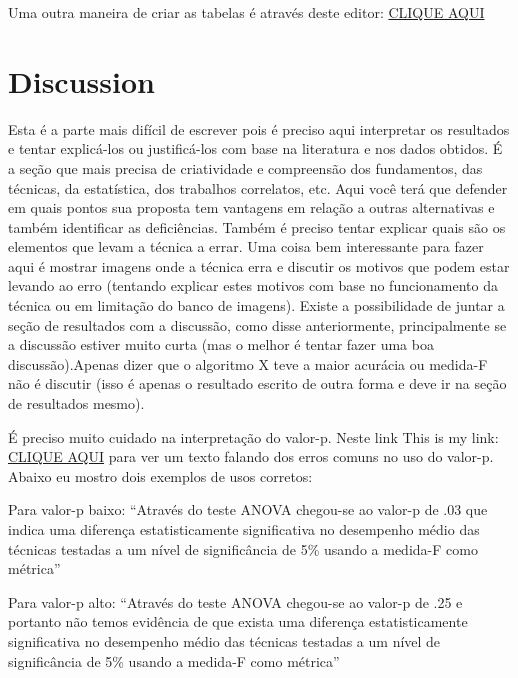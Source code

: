 \documentclass[preprint,10pt,5p]{elsarticle}
\begin{document}
Uma outra maneira de criar as tabelas é através deste editor: \href{https://www.tablesgenerator.com/}{CLIQUE AQUI}








\section{Discussion}




Esta é a parte mais difícil de escrever pois é preciso aqui interpretar os resultados e tentar explicá-los ou justificá-los com base na literatura e nos dados obtidos. É a seção que mais precisa de criatividade e compreensão dos fundamentos, das técnicas, da estatística, dos trabalhos correlatos, etc. Aqui você terá que defender em quais pontos sua proposta tem vantagens em relação a outras alternativas e também identificar as deficiências. Também é preciso tentar explicar quais são os elementos que levam a técnica a errar. Uma coisa bem interessante para fazer aqui é mostrar imagens onde a técnica erra e discutir os motivos que podem estar levando ao erro (tentando explicar estes motivos com base no funcionamento da técnica ou em limitação do banco de imagens). Existe a possibilidade de juntar a seção de resultados com a discussão, como disse anteriormente,  principalmente se a discussão estiver muito curta (mas o melhor é tentar fazer uma boa discussão).Apenas dizer que o algoritmo X teve a maior acurácia ou medida-F não é discutir (isso é apenas o resultado escrito de outra forma e deve ir na seção de resultados mesmo).


É preciso muito cuidado na interpretação do valor-p. Neste link This is my link: \href{https://www.scielo.br/pdf/jbpneu/v41n5/pt_1806-3713-jbpneu-41-05-00485.pdf}{CLIQUE AQUI} para ver um texto falando dos erros comuns no uso do valor-p. Abaixo eu mostro dois exemplos de usos corretos:

Para valor-p baixo: ``Através do teste ANOVA chegou-se ao valor-p de .03 que indica uma diferença estatisticamente significativa no desempenho médio das técnicas testadas a um nível de significância de 5\% usando a medida-F como métrica'' 

Para valor-p alto: ``Através do teste ANOVA chegou-se ao valor-p de .25 e portanto não temos evidência de que exista uma diferença estatisticamente significativa no desempenho médio das técnicas testadas a um nível de significância de 5\% usando a medida-F como métrica'' 
\end{document}
